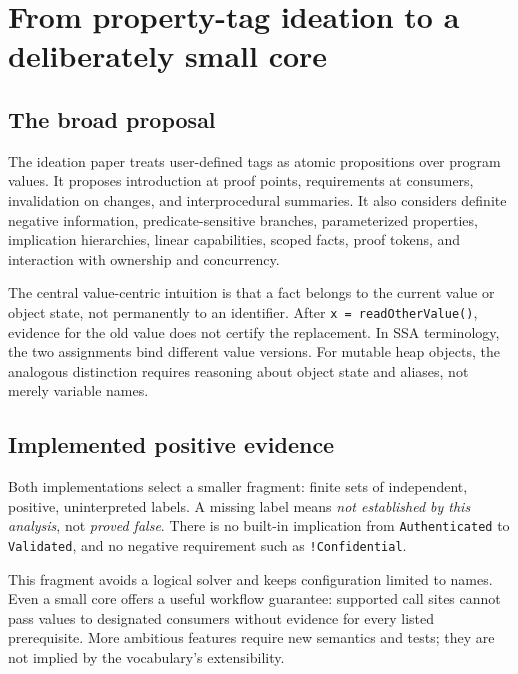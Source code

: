 \documentclass[11pt]{article}
\begin{document}
\section{From property-tag ideation to a deliberately small core}
\subsection{The broad proposal}
The ideation paper treats user-defined tags as atomic propositions over
program values. It proposes introduction at proof points, requirements at
consumers, invalidation on changes, and interprocedural summaries. It also
considers definite negative information, predicate-sensitive branches,
parameterized properties, implication hierarchies, linear capabilities,
scoped facts, proof tokens, and interaction with ownership and concurrency.

The central value-centric intuition is that a fact belongs to the current
value or object state, not permanently to an identifier. After
\texttt{x = readOtherValue()}, evidence for the old value does not certify
the replacement. In SSA terminology, the two assignments bind different
value versions. For mutable heap objects, the analogous distinction requires
reasoning about object state and aliases, not merely variable names.

\subsection{Implemented positive evidence}
Both implementations select a smaller fragment: finite sets of independent,
positive, uninterpreted labels. A missing label means \emph{not established
by this analysis}, not \emph{proved false}. There is no built-in implication
from \texttt{Authenticated} to \texttt{Validated}, and no negative requirement
such as \texttt{!Confidential}.

This fragment avoids a logical solver and keeps configuration limited to
names. Even a small core offers a useful workflow guarantee: supported call
sites cannot pass values to designated consumers without evidence for every
listed prerequisite. More ambitious features require new semantics and tests;
they are not implied by the vocabulary's extensibility.
\end{document}
